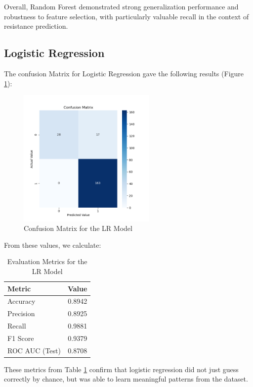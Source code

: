 \documentclass{article}
\begin{document}
Overall, Random Forest demonstrated strong generalization performance and robustness to feature selection, with particularly valuable recall in the context of resistance prediction.

\subsection{Logistic Regression}

The confusion Matrix for Logistic Regression gave the following results (Figure \ref{fig:lg_confusion_matrix}):

\begin{figure}[h]
  \centering
  \includegraphics[width=0.6\textwidth]{confusion_matrix_Logistic_Regression.png}
  \caption{Confusion Matrix for the LR Model}
  \label{fig:lg_confusion_matrix}
\end{figure}
From these values, we calculate:

\begin{table}[h!]
\centering
\caption{Evaluation Metrics for the LR Model}
\label{tab:evaluation_metrics_LR_test}
\begin{tabular}{|l|c|}
\hline
\textbf{Metric} & \textbf{Value} \\
\hline
Accuracy       & 0.8942 \\
Precision      & 0.8925 \\
Recall         & 0.9881 \\
F1 Score       & 0.9379 \\
ROC AUC (Test) & 0.8708 \\
\hline
\end{tabular}
\end{table}

These metrics from Table \ref{tab:evaluation_metrics_LR_test} confirm that logistic regression did not just guess correctly by chance, but was able to learn meaningful patterns from the dataset.
\end{document}
